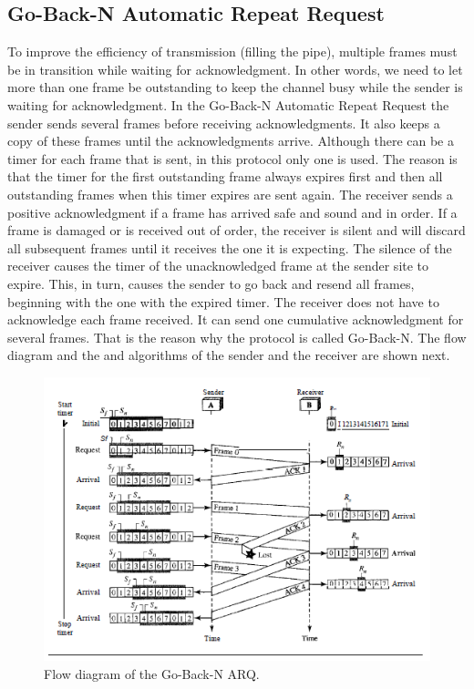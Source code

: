 \documentclass[12pt,a4paper]{report}
\begin{document}
\subsection{Go-Back-N Automatic Repeat Request}
To improve the efficiency of transmission (filling the pipe), multiple frames must be in
transition while waiting for acknowledgment. In other words, we need to let more than
one frame be outstanding to keep the channel busy while the sender is waiting for
acknowledgment. In the Go-Back-N Automatic Repeat Request the sender sends several frames before receiving acknowledgments. It also keeps a copy of these frames until the acknowledgments
arrive. Although there can be a timer for each frame that is sent, in this protocol only one is used. The reason is that the timer for the first outstanding frame always expires first and then all outstanding frames when this timer expires are sent again. The receiver sends a positive acknowledgment if a frame has arrived safe and sound
and in order. If a frame is damaged or is received out of order, the receiver is silent and
will discard all subsequent frames until it receives the one it is expecting. The silence of
the receiver causes the timer of the unacknowledged frame at the sender site to expire.
This, in turn, causes the sender to go back and resend all frames, beginning with the one
with the expired timer. The receiver does not have to acknowledge each frame received.
It can send one cumulative acknowledgment for several frames. That is the reason why the protocol is called Go-Back-N. The flow diagram and the and algorithms of the sender and the receiver are shown next. 
\begin{figure}[H]
\begin{center}
\includegraphics[scale=1]{diagramN.PNG}  
\caption{Flow diagram of the Go-Back-N ARQ.}
\end{center}
\end{figure} 
\end{document}
